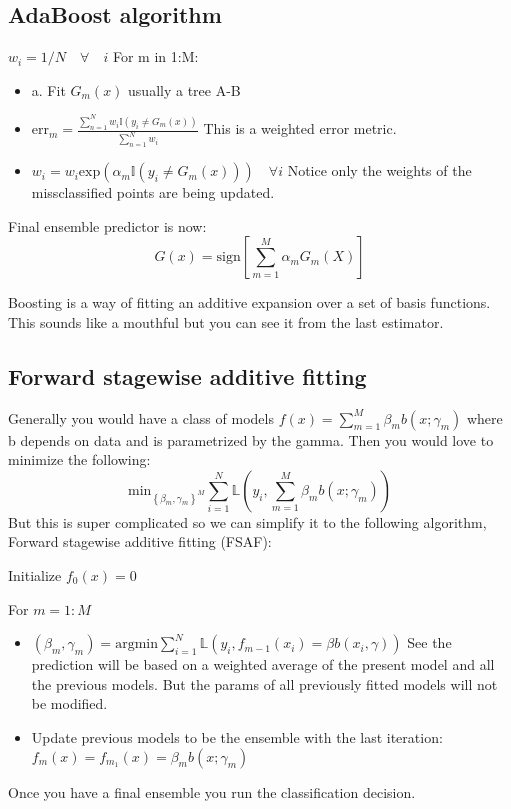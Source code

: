 \documentclass{article}
\begin{document}
\subsection{AdaBoost algorithm}
$w_i = 1/N \quad \forall \quad i$
For m in 1:M:
\begin{itemize}
    \item a. Fit $G_m(x)$ usually a tree A-B 
    \item $\text{err}_m = \frac{\sum_{n = 1}^{N} w_i \mathbb{I}(y_i \neq G_m(x))}{\sum_{n = 1}^{N} w_i}$ 
    This is a weighted error metric.
    \item $w_i = w_i \text{exp}(\alpha_m \mathbb{I}(y_i \neq G_m(x))) \quad \forall i$ Notice only the weights of the missclassified points are 
    being updated.

\end{itemize}
Final ensemble predictor is now: $$G(x) = \text{sign}[\sum_{m = 1}^{M} \alpha_m G_m (X)]$$        

Boosting is a way of fitting an additive expansion over a set of basis functions. This sounds like a mouthful but you can see it from the last estimator. 

\subsection{Forward stagewise additive fitting}
Generally you would have a class of models $f(x) = \sum_{m = 1}^{M} \beta_m b(x;\gamma_m)$ where b depends on data and is parametrized by the gamma.
Then you would love to minimize the following:
$$\text{min}_{\left\{\beta_m, \gamma_m\right\}^M } \sum_{i = 1}^{N} \mathbb{L} (y_i, \sum_{m = 1}^{M} \beta_m b(x;\gamma_m))  $$
But this is super complicated so we can simplify it to the following algorithm, Forward stagewise additive fitting (FSAF):

Initialize $f_0(x) = 0$

For $m = 1:M$
\begin{itemize}
    \item $(\beta_m,\gamma_m) = \text{argmin}\sum_{i = 1}^{N}  \mathbb{L}(y_i, f_{m-1}(x_i) = \beta b(x_i,\gamma)) $ See the prediction will be based on a 
    weighted average of the present model and all the previous models. But the params of all previously fitted models will not be modified.
    \item Update previous models to be the ensemble with the last iteration: $f_m(x) = f_{m_1}(x) = \beta_m b(x;\gamma_m)$
\end{itemize}
Once you have a final ensemble you run the classification decision.
\end{document}
